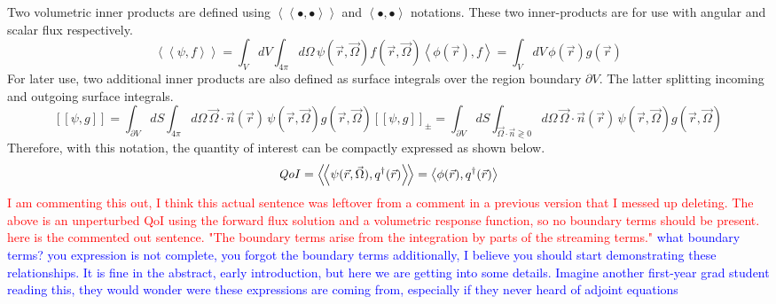 \documentclass[12pt]{report}
\newcommand{\vr}{\vec{r}}
\newcommand{\vO}{\vec{\Omega}}
\newcommand{\bra}{\left\langle}
\newcommand{\ket}{\right\rangle}
\newcommand{\braSN}{\left\langle \! \left\langle}
\newcommand{\ketSN}{\right\rangle \! \right\rangle}
\newcommand{\sbraSN}{\left[ \! \left[}
\newcommand{\sketSN}{\right] \! \right]}
\newcommand{\bound}{\partial V}
\newcommand{\vn}{\vec{n}}
\newcommand{\scalResp}{q^\dag}
\newcommand{\qoi}{{\it QoI}\xspace}
\newcommand{\comment}[2]{\marginpar{\textcolor{#2}{$\star$}}\textcolor{#2}{#1}\newline}
\newcommand{\iwh}[1]{\comment{#1}{red}}
\newcommand{\jcr}[1]{\comment{#1}{blue}}
\newcommand{\iwh}[1]{\phantom{a}}
\newcommand{\jcr}[1]{\phantom{a}}
\begin{document}
Two volumetric inner products are defined using $\braSN \bullet , \bullet \ketSN$ and $\bra \bullet , \bullet \ket$ notations. These two inner-products are for use with angular and scalar flux respectively. 
\begin{subequations}
\begin{equation}
\braSN \psi , f \ketSN  = \int_V dV \int_{4 \pi} d \Omega \,  \psi(\vr, \vO)f(\vr, \vO)
\end{equation}
\begin{equation}
\bra \phi(\vr) , f \ket  = \int_V dV \,  \phi(\vr) g(\vr)
\end{equation}
\end{subequations}
For later use, two additional inner products are also defined as surface integrals over the region 
boundary $\partial V$. The latter splitting incoming and outgoing surface integrals.
\begin{subequations}
\begin{equation}
\sbraSN \psi , g \sketSN  = \int_{\bound} dS \int_{4 \pi} d \Omega \, \vO \cdot \vn(\vr) \, \psi(\vr, \vO)g(\vr, \vO)
\end{equation}
\begin{equation}
\sbraSN \psi , g \sketSN_{\pm}   = \int_{\bound} dS \int_{\vO \cdot \vn \gtrless 0} d\Omega \,  \vO \cdot \vn(\vr) \, \psi(\vr, \vO)g(\vr, \vO)
\end{equation}
\end{subequations}
Therefore, with this notation, the quantity of interest can be compactly expressed as shown below.
\begin{equation}
\label{QoIDef}
\qoi = \braSN \psi(\vr,\vO), \scalResp(\vr) \ketSN  = \bra \phi(\vr) , \scalResp(\vr) \ket
\end{equation}
\iwh{I am commenting this out, I think this actual sentence was leftover from a comment in a previous version that I messed up deleting. 
The above is an unperturbed QoI using the forward flux solution and a volumetric response function, so no boundary terms should be present. 
here is the commented out sentence. "The boundary terms arise from the integration by parts of the streaming terms."}
\jcr{what boundary terms? you expression is not complete, you forgot the boundary terms}
\jcr{additionally, I believe you should start demonstrating these relationships. It is fine in the abstract,
 early introduction, but here we are getting into some details. Imagine another
first-year grad student reading this, they would wonder were these expressions are coming from, 
especially if they never heard of adjoint equations}
\end{document}
